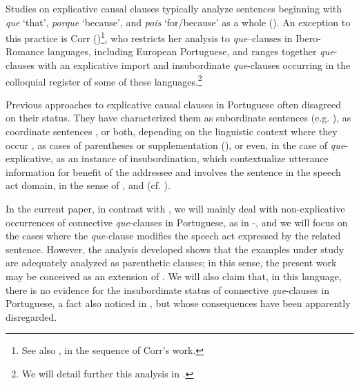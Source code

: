 \documentclass[output=paper,colorlinks,citecolor=brown,
]{langscibook}
\begin{document}
Studies on explicative causal clauses typically analyze sentences beginning with \textit{que} ‘that’, \textit{porque} ‘because’, and \textit{pois} ‘for/because’ as a whole (\citealt{cunha_nova_2001,bechara_moderna_2019,neves_gramatica_2011,matos_estruturas_2013,matos_coordenacao_2004,matos_alternation_2013,peres_notes_2005,lopes_contributos_2012,colaco_explicative_2016}). An exception to this practice is Corr (\citeyear{corr_ibero-romance_2016,corr_matrix_2018})\footnote{See also \citet{kocher_unselected_2019}, in the sequence of Corr’s \citeyearpar{corr_ibero-romance_2016} work.}, who restricts her analysis to \textit{que}–clauses in Ibero-Romance languages, including European Portuguese, and ranges together \textit{que}-clauses with an explicative import and insubordinate \textit{que}-clauses occurring in the colloquial register of some of these languages.\footnote{We will detail further this analysis in .}

Previous approaches to explicative causal clauses in Portuguese often disagreed on their status. They have characterized them as subordinate sentences (e.g. \citealt{bechara_moderna_2019,neves_gramatica_2011,matos_estruturas_2003,matos_coordenacao_2004}), as coordinate sentences \citep{lobo_aspectos_2003}, or both, depending on the linguistic context where they occur \citep{cunha_nova_2001}, as cases of parentheses \citep{colaco_explicative_2016} or supplementation (\citealt{peres_notes_2005,lopes_contributos_2012}), or even, in the case of \textit{que}-explicative, as an instance of insubordination, which contextualize utterance information for benefit of the addressee and involves the sentence in the speech act domain, in the sense of \citet{speas_configurational_2003}, \citet{haegeman_syntacticization_2013} and \citet{haegeman_west_2014} (cf. \citealt{corr_ibero-romance_2016,corr_matrix_2018}). 

In the current paper, in contrast with \citet{colaco_explicative_2016}, we will mainly deal with non-explicative occurrences of connective \textit{que}-clauses in Portuguese, as in -, and we will focus on the cases where the \textit{que}-clause modifies the speech act expressed by the related sentence. However, the analysis developed shows that the examples under study are adequately analyzed as parenthetic clauses; in this sense, the present work may be conceived as an extension of \citet{colaco_explicative_2016}. We will also claim that, in this language, there is no evidence for the insubordinate status of connective \textit{que}-clauses in Portuguese, a fact also noticed in \citet{corr_ibero-romance_2016}, but whose consequences have been apparently disregarded.
\end{document}
